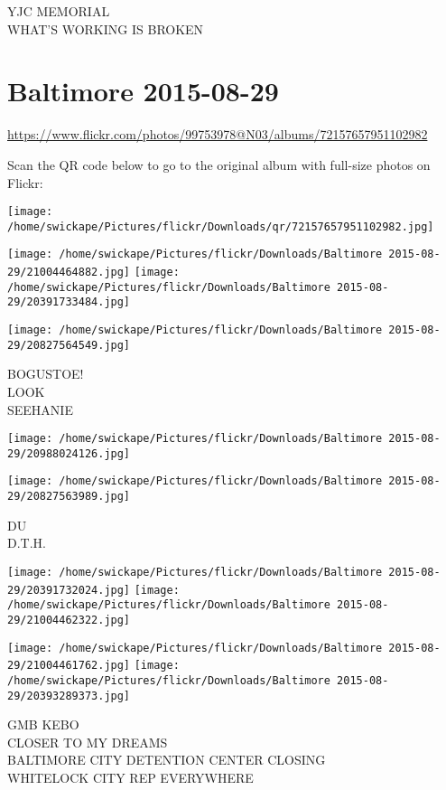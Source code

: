 \documentclass[10pt,letterpaper]{article}
\begin{document}
YJC MEMORIAL\\
WHAT'S WORKING IS BROKEN
\pagebreak

\section*{Baltimore 2015-08-29}

\url{https://www.flickr.com/photos/99753978@N03/albums/72157657951102982}

Scan the QR code below to go to the original album with full-size photos on Flickr:

\texttt{[image: /home/swickape/Pictures/flickr/Downloads/qr/72157657951102982.jpg]}
\pagebreak

\texttt{[image: /home/swickape/Pictures/flickr/Downloads/Baltimore 2015-08-29/21004464882.jpg]}
\texttt{[image: /home/swickape/Pictures/flickr/Downloads/Baltimore 2015-08-29/20391733484.jpg]}

\vspace{0.25in}
\texttt{[image: /home/swickape/Pictures/flickr/Downloads/Baltimore 2015-08-29/20827564549.jpg]}

BOGUSTOE!\\
LOOK\\
SEEHANIE
\pagebreak

\texttt{[image: /home/swickape/Pictures/flickr/Downloads/Baltimore 2015-08-29/20988024126.jpg]}

\vspace{0.25in}
\texttt{[image: /home/swickape/Pictures/flickr/Downloads/Baltimore 2015-08-29/20827563989.jpg]}

DU\\
D.T.H.
\pagebreak

\texttt{[image: /home/swickape/Pictures/flickr/Downloads/Baltimore 2015-08-29/20391732024.jpg]}
\texttt{[image: /home/swickape/Pictures/flickr/Downloads/Baltimore 2015-08-29/21004462322.jpg]}

\texttt{[image: /home/swickape/Pictures/flickr/Downloads/Baltimore 2015-08-29/21004461762.jpg]}
\texttt{[image: /home/swickape/Pictures/flickr/Downloads/Baltimore 2015-08-29/20393289373.jpg]}

GMB KEBO\\
CLOSER TO MY DREAMS\\
BALTIMORE CITY DETENTION CENTER CLOSING\\
WHITELOCK CITY REP EVERYWHERE
\pagebreak
\end{document}
